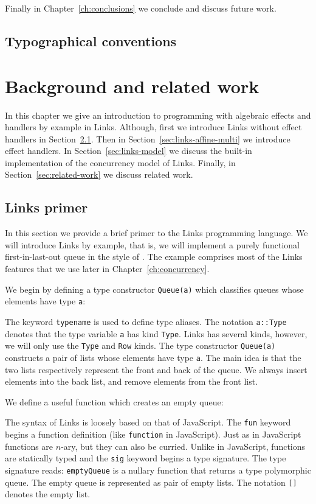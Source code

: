 \documentclass[12pt,mscres,cdtppar,twoside,openright,logo,rightchapter,normalheadings]{infthesis}
\newcommand{\snippet}[1]{}
\theoremstyle{definition}
\begin{document}
Finally in Chapter~\ref{ch:conclusions} we conclude and discuss future
work.

\section{Typographical conventions}


\chapter{Background and related work}
\label{ch:background}
In this chapter we give an introduction to programming with algebraic
effects and handlers by example in Links. Although, first we introduce
Links without effect handlers in Section~\ref{sec:links-primer}. Then
in Section~\ref{sec:links-affine-multi} we introduce effect
handlers. In Section~\ref{sec:links-model} we discuss the built-in
implementation of the concurrency model of Links. Finally, in
Section~\ref{sec:related-work} we discuss related work.

\section{Links primer}
\label{sec:links-primer}
In this section we provide a brief primer to the Links programming
language. We will introduce Links by example, that is, we will
implement a purely functional first-in-last-out queue in the style of
\cite{Okasaki1998}. The example comprises most of the Links features
that we use later in Chapter~\ref{ch:concurrency}.

We begin by defining a type constructor \lstinline$Queue(a)$ which
classifies queues whose elements have type \lstinline$a$:
%
\snippet{queue.links}
%
The keyword \lstinline$typename$ is used to define type aliases. The
notation \lstinline$a::Type$ denotes that the type variable
\lstinline$a$ has kind \lstinline$Type$. Links has several kinds,
however, we will only use the \lstinline$Type$ and \lstinline$Row$
kinds. The type constructor \lstinline$Queue(a)$ constructs a pair of
lists whose elements have type \lstinline$a$. The main idea is that
the two lists respectively represent the front and back of the
queue. We always insert elements into the back list, and remove
elements from the front list.

We define a useful function which creates an empty queue:
%
\snippet{emptyQueue.links}
%
The syntax of Links is loosely based on that of JavaScript. The
\lstinline$fun$ keyword begins a function definition (like
\lstinline$function$ in JavaScript). Just as in JavaScript functions
are $n$-ary, but they can also be curried.  Unlike in JavaScript,
functions are statically typed and the \lstinline$sig$ keyword begins
a type signature. The type signature reads: \lstinline$emptyQueue$ is
a nullary function that returns a type polymorphic queue. The empty
queue is represented as pair of empty lists. The notation
\lstinline$[]$ denotes the empty list.
\end{document}
